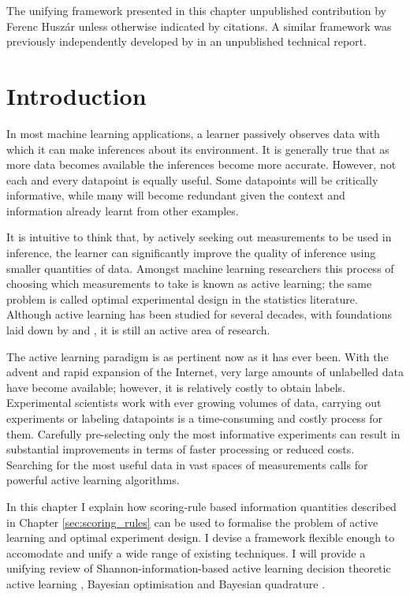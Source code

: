 \begin{summarycontributions}
The unifying framework presented in this chapter unpublished contribution by Ferenc Husz\'{a}r unless otherwise indicated by citations. A similar framework was previously independently developed by \citet{Dawid1994} in an unpublished technical report.
\end{summarycontributions}

\section{Introduction}

In most machine learning applications, a learner passively observes data with which it can make inferences about its environment. It is generally true that as more data becomes available the inferences become more accurate. However, not each and every datapoint is equally useful. Some datapoints will be critically informative, while many will become redundant given the context and information already learnt from other examples.

It is intuitive to think that, by actively seeking out measurements to be used in inference, the learner can significantly improve the quality of inference using smaller quantities of data. Amongst machine learning researchers this process of choosing which measurements to take is known as active learning; the same problem is called optimal experimental design in the statistics literature. Although active learning has been studied for several decades, with foundations laid down by \citet{lindley1956} and \citet{jaynes1957}, it is still an active area of research.

The active learning paradigm is as pertinent now as it has ever been. With the advent and rapid expansion of the Internet, very large amounts of unlabelled data have become available; however, it is relatively costly to obtain labels. Experimental scientists work with ever growing volumes of data, carrying out experiments or labeling datapoints is a time-consuming and costly process for them. Carefully pre-selecting only the most informative experiments can result in substantial improvements in terms of faster processing or reduced costs. Searching for the most useful data in vast spaces of measurements calls for powerful active learning algorithms.

In this chapter I explain how scoring-rule based information quantities described in Chapter \ref{sec:scoring_rules} can be used to formalise the problem of active learning and optimal experiment design. I devise a framework flexible enough to accomodate and unify a wide range of existing techniques. I will provide a unifying review of Shannon-information-based active learning \citep{Krause2006,MacKay1992,Houlsby2011} decision theoretic active learning \citep{Kapoor2007,Zhu2003active}, Bayesian optimisation \citep{Hennig2012entropy,Hennig2012newton} and Bayesian quadrature \citep{BZHermiteQuadrature,BZMonteCarlo}.

